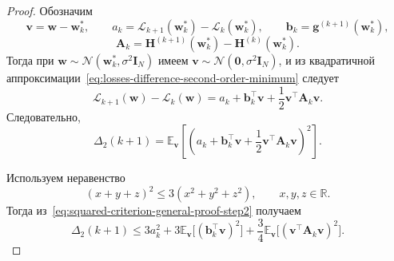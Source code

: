 \begin{proof}
    Обозначим
    \begin{equation}
        \mathbf v = \mathbf w-\mathbf w_k^*,
        \qquad
        a_k = \mathcal L_{k+1}(\mathbf w_k^*)-\mathcal L_k(\mathbf w_k^*),
        \qquad
        \mathbf b_k = \mathbf g^{(k+1)}(\mathbf w_k^*),
    \end{equation}
    \begin{equation}
        \mathbf A_k
        =
        \mathbf H^{(k+1)}(\mathbf w_k^*)
        -
        \mathbf H^{(k)}(\mathbf w_k^*).
    \end{equation}
    Тогда при $\mathbf w \sim \mathcal N(\mathbf w_k^*, \sigma^2 \mathbf I_N)$ имеем
    $\mathbf v \sim \mathcal N(\mathbf 0, \sigma^2 \mathbf I_N)$, и из
    квадратичной аппроксимации~\eqref{eq:losses-difference-second-order-minimum}
    следует
    \begin{equation}
        \label{eq:squared-criterion-general-proof-step1}
        \mathcal L_{k+1}(\mathbf w)-\mathcal L_k(\mathbf w)
        =
        a_k+\mathbf b_k^\top \mathbf v+\frac12 \mathbf v^\top \mathbf A_k \mathbf v.
    \end{equation}
    Следовательно,
    \begin{equation}
        \label{eq:squared-criterion-general-proof-step2}
        \Delta_2(k+1)
        =
        \mathbb E_{\mathbf v}
        \left[
            \left(
                a_k+\mathbf b_k^\top \mathbf v+\frac12 \mathbf v^\top \mathbf A_k \mathbf v
            \right)^2
        \right].
    \end{equation}

    Используем неравенство
    \begin{equation}
        \label{eq:squared-criterion-general-proof-step3}
        (x+y+z)^2 \leqslant 3(x^2+y^2+z^2),
        \qquad x, y, z \in \mathbb R.
    \end{equation}
    Тогда из~\eqref{eq:squared-criterion-general-proof-step2} получаем
    \begin{equation}
        \label{eq:squared-criterion-general-proof-step4}
        \Delta_2(k+1)
        \leqslant
        3a_k^2
        +
        3\mathbb E_{\mathbf v}\big[(\mathbf b_k^\top \mathbf v)^2\big]
        +
        \frac{3}{4}\mathbb E_{\mathbf v}\big[(\mathbf v^\top \mathbf A_k \mathbf v)^2\big].
    \end{equation}


\end{proof}
